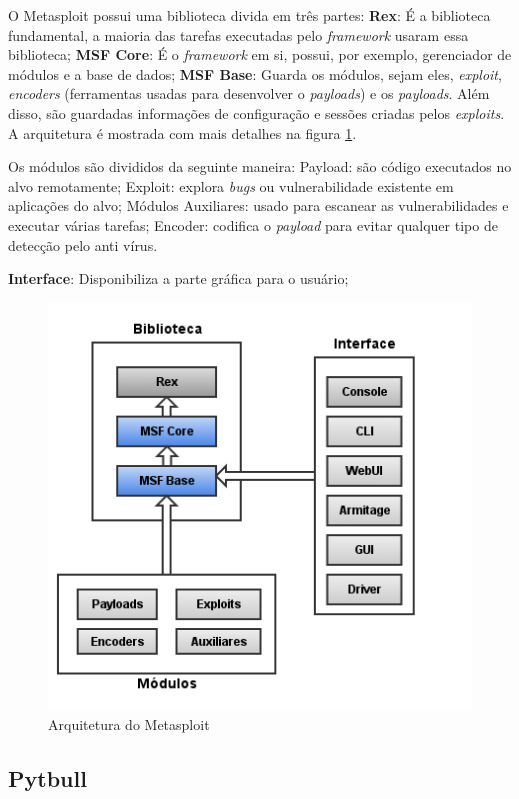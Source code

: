 \documentclass[
	12pt,				
	openright,		
	twoside,	
	a4paper,
	english,	
	brazil	
	]{abntex2}
\begin{document}
 O Metasploit possui uma biblioteca divida em três partes: \textbf{Rex}: É a biblioteca fundamental, a maioria das tarefas executadas pelo \textit{framework} usaram essa biblioteca; \textbf{MSF Core}: É o \textit{framework} em si, possui, por exemplo, gerenciador de módulos e a base de dados; \textbf{MSF Base}: Guarda os módulos, sejam eles, \textit{exploit}, \textit{encoders} (ferramentas usadas para desenvolver o \textit{payloads}) e os \textit{payloads}. Além disso, são guardadas informações de configuração e sessões criadas pelos \textit{exploits}. A arquitetura é mostrada com mais detalhes na figura \ref{fig:arqmetasploit}. 

 Os módulos são divididos da seguinte maneira: Payload: são código executados no alvo remotamente; Exploit: explora \textit{bugs} ou vulnerabilidade existente em aplicações do alvo; Módulos Auxiliares: usado para escanear as vulnerabilidades e executar várias tarefas; Encoder: codifica o \textit{payload} para evitar qualquer tipo de detecção pelo anti vírus.

 \textbf{Interface}: Disponibiliza a parte gráfica para o usuário;

 \begin{figure}[!htb]
  \centering
  \includegraphics[scale=.6]{metasploit_arquitetura.png}
  \caption{Arquitetura do Metasploit}
  \label{fig:arqmetasploit}
 \end{figure}

 \subsection{Pytbull} \label{sec:pytbull}
\end{document}
